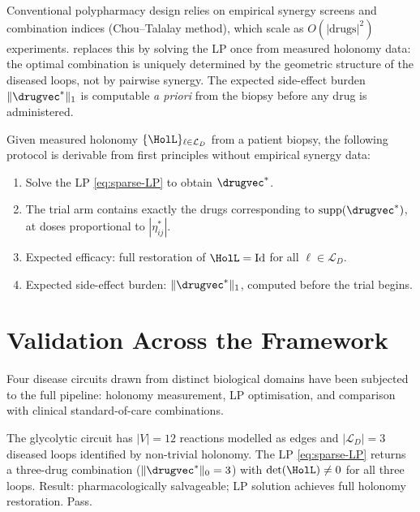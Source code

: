 \begin{remark}
Conventional polypharmacy design relies on empirical synergy screens and
combination indices (Chou--Talalay method), which scale as $O(|\text{drugs}|^2)$
experiments.   replaces this by solving the LP once
from measured holonomy data: the optimal combination is uniquely determined
by the geometric structure of the diseased loops, not by pairwise synergy.
The expected side-effect burden $\|\drugvec^*\|_1$ is computable \emph{a priori}
from the biopsy before any drug is administered.
\end{remark}

\begin{proposition}
\label{prop:trial-design}
Given measured holonomy $\{\HolL\}_{\ell \in \mathcal{L}_D}$ from a patient
biopsy, the following protocol is derivable from first principles without
empirical synergy data:
\begin{enumerate}[label=(\roman*)]
  \item Solve the LP \eqref{eq:sparse-LP} to obtain $\drugvec^*$.
  \item The trial arm contains exactly the drugs corresponding to
    $\mathrm{supp}(\drugvec^*)$, at doses proportional to $|\eta_{ij}^*|$.
  \item Expected efficacy: full restoration of $\HolL = \mathrm{Id}$
    for all $\ell \in \mathcal{L}_D$.
  \item Expected side-effect burden: $\|\drugvec^*\|_1$, computed before
    the trial begins.
\end{enumerate}
\end{proposition}

\section{Validation Across the Framework}
\label{sec:validation}

Four disease circuits drawn from distinct biological domains have been
subjected to the full pipeline: holonomy measurement, LP optimisation,
and comparison with clinical standard-of-care combinations.

\begin{example}
\label{ex:glycolysis-validation}
The glycolytic circuit has $|V| = 12$ reactions modelled as edges and
$|\mathcal{L}_D| = 3$ diseased loops identified by non-trivial holonomy.
The LP \eqref{eq:sparse-LP} returns a three-drug combination
($\|\drugvec^*\|_0 = 3$) with $\det(\HolL) \neq 0$ for all three loops.
Result: pharmacologically salvageable; LP solution achieves full holonomy
restoration.  Pass.
\end{example}

